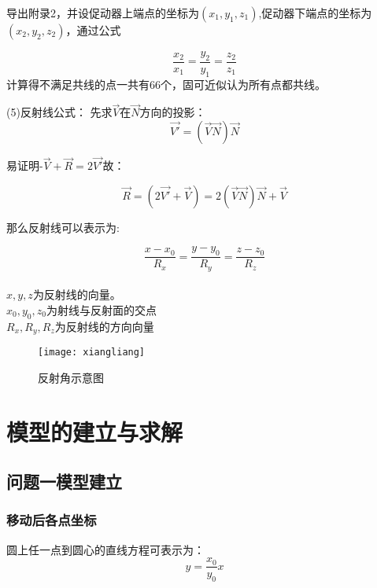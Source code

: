 \documentclass[withoutpreface,bwprint]{cumcmthesis} %
\numberwithin{equation}{subsection}
\begin{document}
导出附录2，并设促动器上端点的坐标为$(x_1,y_1,z_1)$,促动器下端点的坐标为$(x_2,y_2,z_2)$，通过公式

\begin{equation}
	\frac{x_2}{x_1}=\frac{y_2}{y_1}=\frac{z_2}{z_1}
\end{equation}
计算得不满足共线的点一共有66个，固可近似认为所有点都共线。

(5)反射线公式：
先求$\vec{V}$在$\vec{N}$方向的投影：
\begin{equation}
	\vec{V'}=(\vec{V}\vec{N})\vec{N}
\end{equation}

易证明-$\vec{V}+\vec{R}=2\vec{V'}$故：

\begin{equation}
	\vec{R}=(2\vec{V'}+\vec{V})=2(\vec{V}\vec{N})\vec{N}+\vec{V}
\end{equation}

那么反射线可以表示为:

\begin{equation}
\frac{x-x_0}{R_x}=\frac{y-y_0}{R_y}=\frac{z-z_0}{R_z}
\end{equation}
\\
$x,y,z$为反射线的向量。\\
$x_0,y_0,z_0$为射线与反射面的交点\\
$R_x,R_y,R_z$为反射线的方向向量\\


\begin{figure}[!h]
	\centering
	\texttt{[image: xiangliang]}
	\caption{反射角示意图}
	\label{fig:3}
\end{figure}

\section{模型的建立与求解}

\subsection{问题一模型建立}

\subsubsection{移动后各点坐标}


圆上任一点到圆心的直线方程可表示为：
\begin{equation}
	y=\frac{x_0{}}{y_0{}}x
\end{equation}
\\
\end{document}
